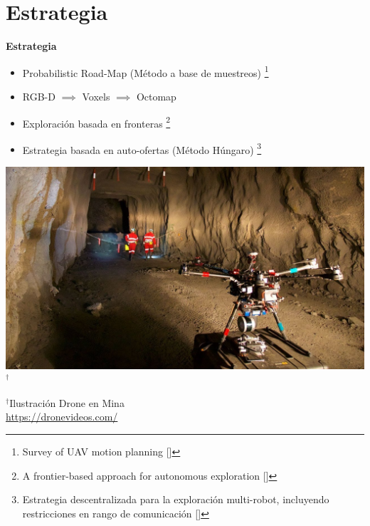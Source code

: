 \documentclass[
  24pt, %
  aspectratio=169, %
]{beamer}
\begin{document}
\section{Estrategia}
\begin{frame}
  \begin{minipage}{0.47\textwidth}
    \textbf{Estrategia}
    \begin{itemize}
    \item \small Probabilistic Road-Map (Método a base de muestreos) \footnote{Survey of UAV motion planning [\cite{Quan2020}]}  
    \item \small RGB-D $\implies$ Voxels $\implies$ Octomap
      
    \item \small Exploración basada en fronteras \footnote{A frontier-based approach for autonomous exploration [\cite{613851}]}
    \item \small Estrategia basada en auto-ofertas (Método Húngaro) \footnote{Estrategia descentralizada para la exploración multi-robot, incluyendo restricciones en rango de comunicación [\cite{LEAL2013}]}
      
    \end{itemize}
  \end{minipage}
  \hspace{0.1cm}
  \begin{minipage}{0.5\textwidth}
    \includegraphics[width=\textwidth]{maxresdefault.jpg}$^\dag$\\
    \rule{0in}{1.2em}$^\dag$\scriptsize Ilustración Drone en Mina \\
    \tiny \url{https://dronevideos.com/} 
  \end{minipage}
  
\end{frame}
\end{document}
